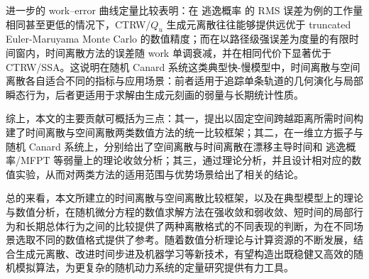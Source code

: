 进一步的 work–error 曲线定量比较表明：在 逃逸概率 的 RMS 误差为例的工作量相同甚至更低的情况下，CTRW/\(Q_u\) 生成元离散往往能够提供远优于 truncated Euler-Maruyama Monte Carlo 的数值精度；而在以路径级强误差为度量的有限时间窗内，时间离散方法的误差随 work 单调衰减，并在相同代价下显著优于 CTRW/SSA。这说明在随机 Canard 系统这类典型快-慢模型中，时间离散与空间离散各自适合不同的指标与应用场景：前者适用于追踪单条轨道的几何演化与局部瞬态行为，后者更适用于求解由生成元刻画的弱量与长期统计性质。

综上，本文的主要贡献可概括为三点：其一，提出以固定空间跨越距离所需时间构建了时间离散与空间离散两类数值方法的统一比较框架；其二，在一维立方振子与随机 Canard 系统上，分别给出了空间离散与时间离散在漂移主导时间和 逃逸概率/MFPT 等弱量上的理论收敛分析；其三，通过理论分析，并且设计相对应的数值实验，从而对两类方法的适用范围与优势场景给出了相关的结论。


总的来看，本文所建立的时间离散与空间离散比较框架，以及在典型模型上的理论与数值分析，在随机微分方程的数值求解方法在强收敛和弱收敛、短时间的局部行为和长期总体行为之间的比较提供了两种离散格式的不同表现的判断，为在不同场景选取不同的数值格式提供了参考。随着数值分析理论与计算资源的不断发展，结合生成元离散、改进时间步进及机器学习等新技术，有望构造出既稳健又高效的随机模拟算法，为更复杂的随机动力系统的定量研究提供有力工具。





\newpage




